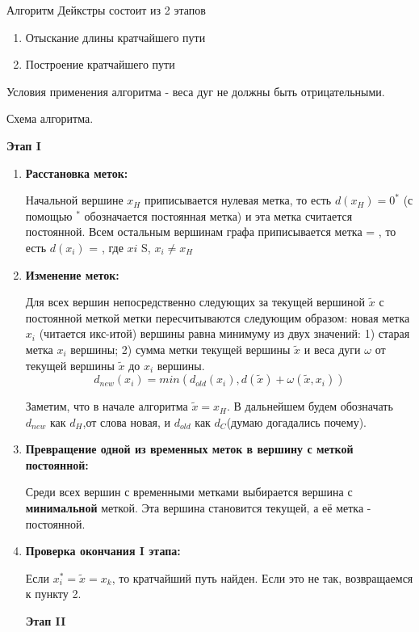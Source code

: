 \documentclass[12pt, a4paper, oneside]{article}
\theoremstyle{plain} %
\theoremstyle{definition}
\newcommand{\indef}[1]{\textbf{ \color{dark_red} #1}}
\begin{document}
Алгоритм Дейкстры состоит из 2 этапов
\begin{enumerate}

\item Отыскание длины кратчайшего пути

\item Построение кратчайшего пути

\end{enumerate}

Условия применения алгоритма - веса дуг не должны быть отрицательными.

Схема алгоритма.

\indef{Этап I}

\begin{enumerate}

\item \textbf{Расстановка меток:}

Начальной вершине $x_H$ приписывается нулевая метка, то есть $d(x_H) = 0^*$ (с помощью $^*$ обозначается постоянная метка) и эта метка считается постоянной. Всем остальным вершинам графа приписывается метка = \infty, то есть $d(x_i)$ = \infty,  где $xi$ \in S, $x_i \neq x_H$
\item \textbf{Изменение меток:}

Для всех вершин непосредственно следующих за текущей вершиной $\tilde x$ с постоянной меткой метки пересчитываются  следующим образом: новая метка $x_i$ (читается икс-итой) вершины равна минимуму из двух значений: 1) старая метка $x_i$ вершины; 2) сумма метки текущей вершины $\tilde x$ и веса дуги $\omega$ от текущей вершины $\tilde x$ до $x_i$ вершины.
\[
d_{new}(x_i) = min(d_{old}(x_i), d(\tilde x) + \omega(\tilde x, x_i ))
\]

Заметим, что в начале алгоритма $\tilde x = x_H$.
В дальнейшем будем обозначать $d_{new}$ как $d_{H}$,от слова новая, и $d_{old}$ как $d_{C}$(думаю догадались почему).

\item \textbf{Превращение одной из временных меток в вершину с меткой постоянной:}

Среди всех вершин с временными метками выбирается вершина с \textbf{минимальной} меткой. Эта вершина становится текущей, а её метка - постоянной. 

\item \textbf{Проверка окончания I этапа:}

Если $x_i^* = \tilde x = x_k$, то кратчайший путь найден. Если это не так, возвращаемся к пункту 2.

\indef{Этап II}


\end{enumerate}
\end{document}
